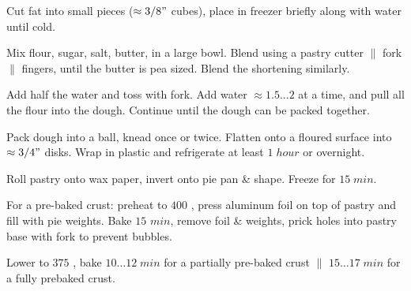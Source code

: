 \begin{preparation}
\item Cut fat into small pieces ($\approx 3/8"$ cubes), place in freezer briefly along with water until cold.

\item Mix flour, sugar, salt, butter, in a large bowl.
Blend using a pastry cutter $\|$ fork $\|$ fingers, until the butter is pea sized.
Blend the shortening similarly.

\item Add half the water and toss with fork.
Add water $\approx 1.5...2$ \Tablespoon at a time, and pull all the flour into the dough.
Continue until the dough can be packed together.

\item Pack dough into a ball, knead once or twice.
Flatten onto a floured surface into $\approx 3/4"$ disks.
Wrap in plastic and refrigerate at least $1\; hour$ or overnight.

\item Roll pastry onto wax paper, invert onto pie pan \& shape. Freeze for $15 \; min$.

\item For a pre-baked crust: preheat to $400$ \Fahrenheit, press aluminum foil on top of pastry and fill with pie weights. Bake $15$ $min$, remove foil \& weights, prick holes into pastry base with fork to prevent bubbles.

\item Lower to $375$ \Fahrenheit, bake $10 \dots 12\; min$ for a partially pre-baked crust $\|$ $15 \dots 17\; min$ for a fully prebaked crust.
\end{preparation}

\recipeend